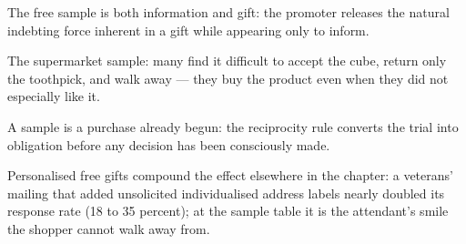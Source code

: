 

\begin{distilled}
  \item The free sample is both information and gift: the promoter releases the natural indebting force inherent in a gift while appearing only to inform.
  \item The supermarket sample: many find it difficult to accept the cube, return only the toothpick, and walk away --- they buy the product even when they did not especially like it.
  \item A sample is a purchase already begun: the reciprocity rule converts the trial into obligation before any decision has been consciously made.
  \item Personalised free gifts compound the effect elsewhere in the chapter: a veterans' mailing that added unsolicited individualised address labels nearly doubled its response rate (18 to 35 percent); at the sample table it is the attendant's smile the shopper cannot walk away from.
\end{distilled}
